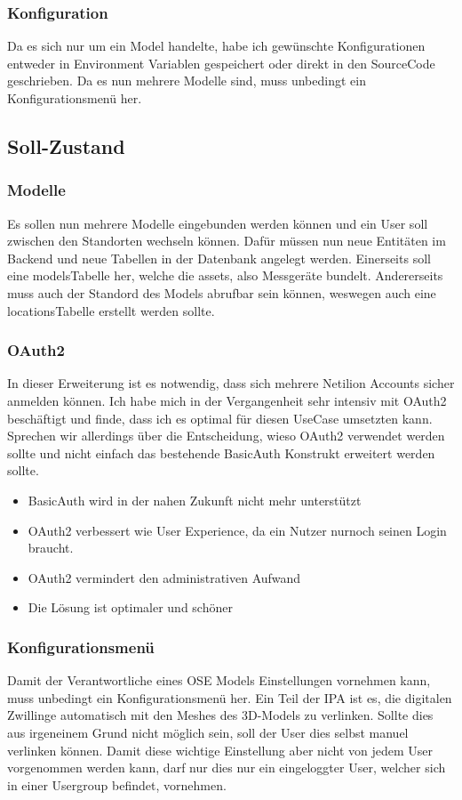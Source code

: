 \subsubsection{Konfiguration}
Da es sich nur um ein Model handelte, habe ich gewünschte Konfigurationen entweder in Environment Variablen gespeichert oder direkt in den SourceCode geschrieben. Da es nun mehrere Modelle sind, muss unbedingt ein Konfigurationsmenü her.
\subsection{Soll-Zustand} \label{soll-zustand}
\subsubsection{Modelle}
Es sollen nun mehrere Modelle eingebunden werden können und ein User soll zwischen den Standorten wechseln können. Dafür müssen nun neue Entitäten im Backend und neue Tabellen in der Datenbank angelegt werden. Einerseits soll eine \flqq models\frqq Tabelle her, welche die \flqq assets\frqq , also Messgeräte bundelt. Andererseits muss auch der Standord des Models abrufbar sein können, weswegen auch eine \flqq locations\frqq Tabelle erstellt werden sollte.
\subsubsection{OAuth2}
In dieser Erweiterung ist es notwendig, dass sich mehrere Netilion Accounts sicher anmelden können. Ich habe mich in der Vergangenheit sehr intensiv mit OAuth2 beschäftigt und finde, dass ich es optimal für diesen UseCase umsetzten kann. Sprechen wir allerdings über die Entscheidung, wieso OAuth2 verwendet werden sollte und nicht einfach das bestehende BasicAuth Konstrukt erweitert werden sollte.
\begin{itemize}
  \item BasicAuth wird in der nahen Zukunft nicht mehr unterstützt
  \item OAuth2 verbessert wie User Experience, da ein Nutzer nurnoch seinen Login braucht.
  \item OAuth2 vermindert den administrativen Aufwand
  \item Die Lösung ist optimaler und schöner
\end{itemize}
\subsubsection{Konfigurationsmenü}
Damit der Verantwortliche eines OSE Models Einstellungen vornehmen kann, muss unbedingt ein Konfigurationsmenü her. Ein Teil der IPA ist es, die digitalen Zwillinge automatisch mit den Meshes des 3D-Models zu verlinken. Sollte dies aus irgeneinem Grund nicht möglich sein, soll der User dies selbst manuel verlinken können. Damit diese wichtige Einstellung aber nicht von jedem User vorgenommen werden kann, darf nur dies nur ein eingeloggter User, welcher sich in einer Usergroup befindet, vornehmen.
